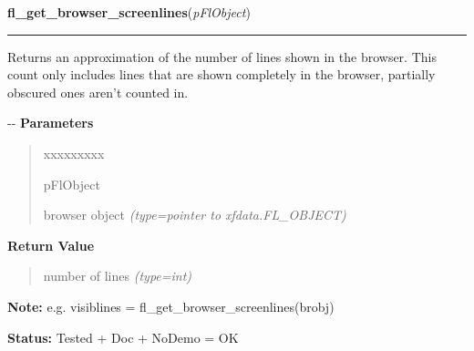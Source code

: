 \hspace{.8\funcindent}\begin{boxedminipage}{\funcwidth}

    \raggedright \textbf{fl\_get\_browser\_screenlines}(\textit{pFlObject})

    \vspace{-1.5ex}

    \rule{\textwidth}{0.5\fboxrule}
\setlength{\parskip}{2ex}

Returns an approximation of the number of lines shown in the browser.
This count only includes lines that are shown completely in the browser,
partially obscured ones aren't counted in.

-{}-
\setlength{\parskip}{1ex}
      \textbf{Parameters}
      \vspace{-1ex}

      \begin{quote}
        \begin{Ventry}{xxxxxxxxx}

          \item[pFlObject]


browser object
            {\it (type=pointer to xfdata.FL\_OBJECT)}

        \end{Ventry}

      \end{quote}

      \textbf{Return Value}
    \vspace{-1ex}

      \begin{quote}

number of lines
      {\it (type=int)}

      \end{quote}

\textbf{Note:} 
e.g. visiblines = fl\_get\_browser\_screenlines(brobj)


\textbf{Status:} 
Tested + Doc + NoDemo = OK


    \end{boxedminipage}

    \label{xformslib:flbrowser:fl_set_browser_topline}

    \vspace{0.5ex}

